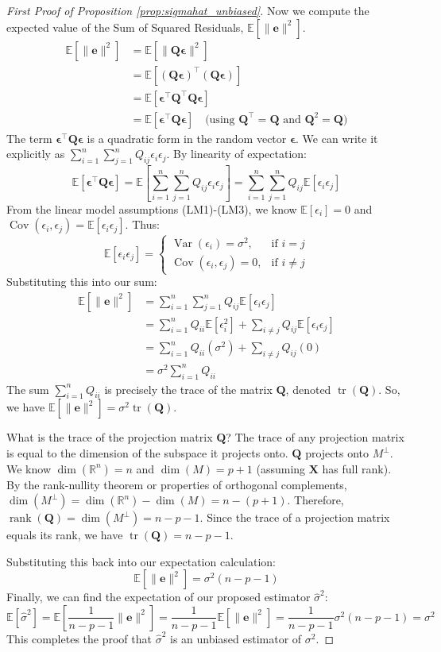 \documentclass[11pt, letterpaper]{article}
\theoremstyle{definition}
\theoremstyle{plain} %
\theoremstyle{remark}
\newcommand{\E}{\mathbb{E}}            %
\newcommand{\Cov}{\operatorname{Cov}}  %
\newcommand{\Var}{\operatorname{Var}}  %
\newcommand{\tr}{\operatorname{tr}}    %
\newcommand{\vb}[1]{\bm{#1}}          %
\newcommand{\mb}[1]{\bm{#1}}          %
\newcommand{\Xmat}{\mb{X}}            %
\newcommand{\Qmat}{\mb{Q}}            %
\newcommand{\epsilonvec}{\vb{\epsilon}}%
\newcommand{\evec}{\vb{e}}            %
\begin{document}
\begin{proof}[First Proof of Proposition \ref{prop:sigmahat_unbiased}]
Now we compute the expected value of the Sum of Squared Residuals, $\E[\|\evec\|^2]$.
\begin{align*}
\E[\|\evec\|^2] &= \E[\|\Qmat\epsilonvec\|^2] \\
&= \E[(\Qmat\epsilonvec)^\top (\Qmat\epsilonvec)] \\
&= \E[\epsilonvec^\top \Qmat^\top \Qmat \epsilonvec] \\
&= \E[\epsilonvec^\top \Qmat \epsilonvec] \quad \text{(using } \Qmat^\top = \Qmat \text{ and } \Qmat^2 = \Qmat \text{)}
\end{align*}
The term $\epsilonvec^\top \Qmat \epsilonvec$ is a quadratic form in the random vector $\epsilonvec$. We can write it explicitly as $\sum_{i=1}^n \sum_{j=1}^n Q_{ij} \epsilon_i \epsilon_j$. By linearity of expectation:
\[
\E[\epsilonvec^\top \Qmat \epsilonvec] = \E\left[\sum_{i=1}^n \sum_{j=1}^n Q_{ij} \epsilon_i \epsilon_j\right] = \sum_{i=1}^n \sum_{j=1}^n Q_{ij} \E[\epsilon_i \epsilon_j]
\]
From the linear model assumptions (LM1)-(LM3), we know $\E[\epsilon_i] = 0$ and $\Cov(\epsilon_i, \epsilon_j) = \E[\epsilon_i \epsilon_j]$. Thus:
\[
\E[\epsilon_i \epsilon_j] = \begin{cases} \Var(\epsilon_i) = \sigma^2, & \text{if } i = j \\ \Cov(\epsilon_i, \epsilon_j) = 0, & \text{if } i \neq j \end{cases}
\]
Substituting this into our sum:
\begin{align*}
\E[\|\evec\|^2] &= \sum_{i=1}^n \sum_{j=1}^n Q_{ij} \E[\epsilon_i \epsilon_j] \\
&= \sum_{i=1}^n Q_{ii} \E[\epsilon_i^2] + \sum_{i \neq j} Q_{ij} \E[\epsilon_i \epsilon_j] \\
&= \sum_{i=1}^n Q_{ii} (\sigma^2) + \sum_{i \neq j} Q_{ij} (0) \\
&= \sigma^2 \sum_{i=1}^n Q_{ii}
\end{align*}
The sum $\sum_{i=1}^n Q_{ii}$ is precisely the trace of the matrix $\Qmat$, denoted $\tr(\Qmat)$.
So, we have $\E[\|\evec\|^2] = \sigma^2 \tr(\Qmat)$.

What is the trace of the projection matrix $\Qmat$? The trace of any projection matrix is equal to the dimension of the subspace it projects onto. $\Qmat$ projects onto $M^\perp$. We know $\dim(\mathbb{R}^n) = n$ and $\dim(M) = p+1$ (assuming $\Xmat$ has full rank). By the rank-nullity theorem or properties of orthogonal complements, $\dim(M^\perp) = \dim(\mathbb{R}^n) - \dim(M) = n - (p+1)$.
Therefore, $\operatorname{rank}(\Qmat) = \dim(M^\perp) = n - p - 1$.
Since the trace of a projection matrix equals its rank, we have $\tr(\Qmat) = n - p - 1$.

Substituting this back into our expectation calculation:
\[
\E[\|\evec\|^2] = \sigma^2 (n - p - 1)
\]
Finally, we can find the expectation of our proposed estimator $\hat{\sigma}^2$:
\[
\E[\hat{\sigma}^2] = \E\left[\frac{1}{n-p-1} \|\evec\|^2\right] = \frac{1}{n-p-1} \E[\|\evec\|^2] = \frac{1}{n-p-1} \sigma^2 (n - p - 1) = \sigma^2
\]
This completes the proof that $\hat{\sigma}^2$ is an unbiased estimator of $\sigma^2$.
\end{proof}
\end{document}
